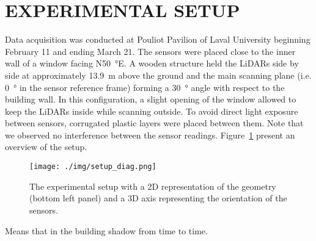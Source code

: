 \section{EXPERIMENTAL SETUP}
Data acquisition was conducted at Pouliot Pavilion of Laval University beginning February 11 and ending March 21. The sensors were placed close to the inner wall of a window facing N\SI{50}{\degree}E. A wooden structure held the LiDARs side by side at approximately \SI{13.9}{\meter} above the ground and the main scanning plane (i.e. \SI{0}{\degree} in the sensor reference frame) forming a \SI{30}{\degree} angle with respect to the building wall. In this configuration, a slight opening of the window allowed to keep the LiDARs inside while scanning outside. To avoid direct light exposure between sensors, corrugated plastic layers were placed between them. Note that we observed no interference between the sensor readings. Figure~\ref{fig:setup} present an overview of the setup.

\begin{figure}[h]
    \centering
    \texttt{[image: ./img/setup\_diag.png]}
    \caption{The experimental setup with a 2D representation of the geometry (bottom left panel) and a 3D axis representing the orientation of the sensors.}
    \label{fig:setup}
\end{figure}

Means that in the building shadow from time to time.

